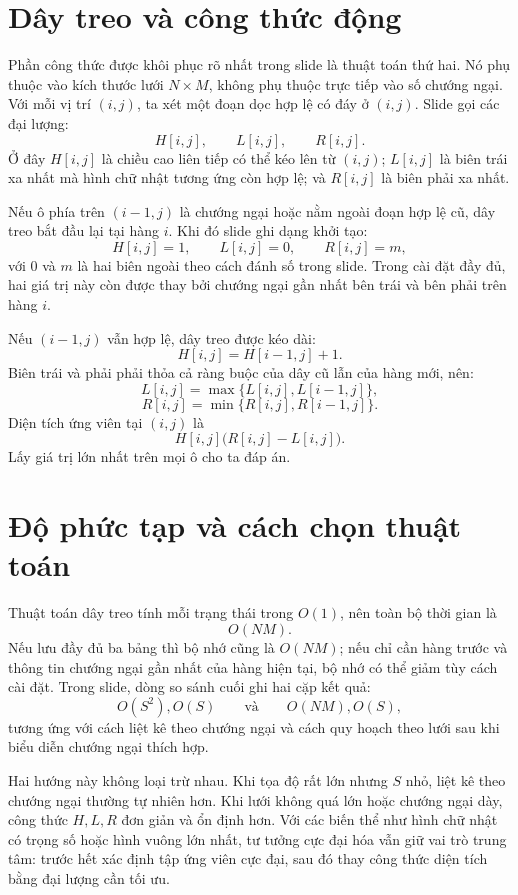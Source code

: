 \documentclass[11pt]{article}
\begin{document}
\section{Dây treo và công thức động}

Phần công thức được khôi phục rõ nhất trong slide là thuật toán thứ hai. Nó
phụ thuộc vào kích thước lưới \(N\times M\), không phụ thuộc trực tiếp vào số
chướng ngại. Với mỗi vị trí \((i,j)\), ta xét một đoạn dọc hợp lệ có đáy ở
\((i,j)\). Slide gọi các đại lượng:
\[
  H[i,j],\qquad L[i,j],\qquad R[i,j].
\]
Ở đây \(H[i,j]\) là chiều cao liên tiếp có thể kéo lên từ \((i,j)\);
\(L[i,j]\) là biên trái xa nhất mà hình chữ nhật tương ứng còn hợp lệ; và
\(R[i,j]\) là biên phải xa nhất.

Nếu ô phía trên \((i-1,j)\) là chướng ngại hoặc nằm ngoài đoạn hợp lệ cũ, dây
treo bắt đầu lại tại hàng \(i\). Khi đó slide ghi dạng khởi tạo:
\[
  H[i,j]=1,\qquad L[i,j]=0,\qquad R[i,j]=m,
\]
với \(0\) và \(m\) là hai biên ngoài theo cách đánh số trong slide. Trong
cài đặt đầy đủ, hai giá trị này còn được thay bởi chướng ngại gần nhất bên
trái và bên phải trên hàng \(i\).

Nếu \((i-1,j)\) vẫn hợp lệ, dây treo được kéo dài:
\[
  H[i,j]=H[i-1,j]+1.
\]
Biên trái và phải phải thỏa cả ràng buộc của dây cũ lẫn của hàng mới, nên:
\[
  L[i,j]=\max\{L[i,j],L[i-1,j]\},
\]
\[
  R[i,j]=\min\{R[i,j],R[i-1,j]\}.
\]
Diện tích ứng viên tại \((i,j)\) là
\[
  H[i,j]\bigl(R[i,j]-L[i,j]\bigr).
\]
Lấy giá trị lớn nhất trên mọi ô cho ta đáp án.

\section{Độ phức tạp và cách chọn thuật toán}

Thuật toán dây treo tính mỗi trạng thái trong \(O(1)\), nên toàn bộ thời gian
là
\[
  O(NM).
\]
Nếu lưu đầy đủ ba bảng thì bộ nhớ cũng là \(O(NM)\); nếu chỉ cần hàng trước
và thông tin chướng ngại gần nhất của hàng hiện tại, bộ nhớ có thể giảm tùy
cách cài đặt. Trong slide, dòng so sánh cuối ghi hai cặp kết quả:
\[
  O(S^2),O(S) \qquad\text{và}\qquad O(NM),O(S),
\]
tương ứng với cách liệt kê theo chướng ngại và cách quy hoạch theo lưới sau
khi biểu diễn chướng ngại thích hợp.

Hai hướng này không loại trừ nhau. Khi tọa độ rất lớn nhưng \(S\) nhỏ, liệt
kê theo chướng ngại thường tự nhiên hơn. Khi lưới không quá lớn hoặc chướng
ngại dày, công thức \(H,L,R\) đơn giản và ổn định hơn. Với các biến thể như
hình chữ nhật có trọng số hoặc hình vuông lớn nhất, tư tưởng cực đại hóa vẫn
giữ vai trò trung tâm: trước hết xác định tập ứng viên cực đại, sau đó thay
công thức diện tích bằng đại lượng cần tối ưu.
\end{document}
